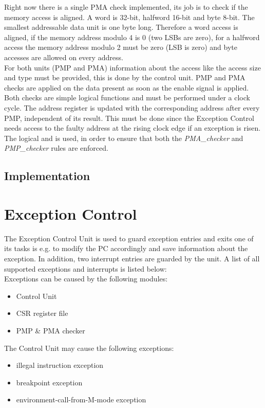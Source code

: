 Right now there is a single PMA check implemented, its job is to check if the memory
access is aligned. A word is 32-bit, halfword 16-bit and byte 8-bit. The smallest
addressable data unit is one byte long. Therefore a word access is aligned, if the
memory address modulo 4 is 0 (two LSBs are zero), for a halfword access the
memory address modulo 2 must be zero (LSB is zero) and byte accesses are allowed
on every address.
\\
For both units (PMP and PMA) information about the access like the access size
and type must be provided, this is done by the control unit. PMP and PMA checks
are applied on the data present as soon as the enable signal is applied. Both checks
are simple logical functions and must be performed under a clock cycle. The address
register is updated with the corresponding address after every PMP, independent of
its result. This must be done since the Exception Control needs access to the faulty
address at the rising clock edge if an exception is risen.
\\
The logical and is used, in order to ensure that both the \textit{PMA\_checker} and
\textit{PMP\_checker} rules are enforced.
\subsection{Implementation}

\section{Exception Control}
The Exception Control Unit is used to guard exception entries and exits one of its
tasks is e.g. to modify the PC accordingly and save information about the exception.
In addition, two interrupt entries are guarded by the unit. A list of all supported
exceptions and interrupts is listed below:\\
Exceptions can be caused by the following modules:
\begin{itemize}
	\item Control Unit
	\item CSR register file
	\item PMP \& PMA checker
\end{itemize}

The Control Unit may cause the following exceptions:
\begin{itemize}
	\item illegal instruction exception
	\item breakpoint exception
	\item environment-call-from-M-mode exception
\end{itemize}

